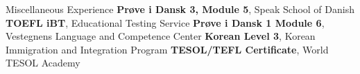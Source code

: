 \begin{rubric}{\faAward Miscellaneous Experience}
\entry*[2026] \textbf{Prøve i Dansk 3, Module 5}, Speak School of Danish
%
\entry*[2025] \textbf{TOEFL iBT}, Educational Testing Service
%
\entry*[2024] \textbf{Prøve i Dansk 1 Module 6}, Vestegnens Language and Competence Center
%
\entry*[2023] \textbf{Korean Level 3}, Korean Immigration and Integration Program
%
\entry*[2021] \textbf{TESOL/TEFL Certificate}, World TESOL Academy
%
\end{rubric}